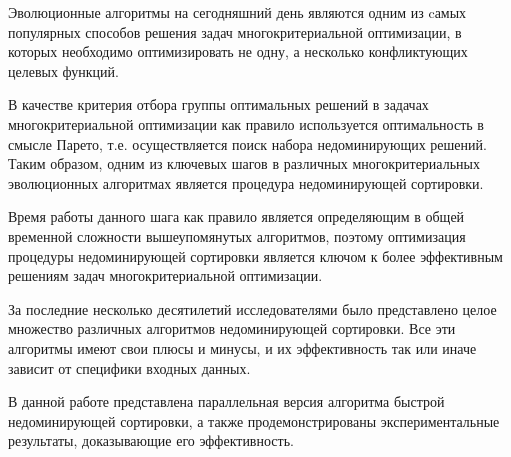 \startprefacepage
Эволюционные алгоритмы на сегодняшний день являются одним из cамых популярных способов решения задач многокритериальной оптимизации, в которых необходимо оптимизировать не одну, а несколько конфликтующих целевых функций.

В качестве критерия отбора группы оптимальных решений в задачах многокритериальной оптимизации как правило используется оптимальность в смысле Парето, т.е. осуществляется поиск набора недоминирующих решений.
Таким образом, одним из ключевых шагов в различных многокритериальных эволюционных алгоритмах является процедура недоминирующей сортировки.

Время работы данного шага как правило является определяющим в общей временной сложности вышеупомянутых алгоритмов, поэтому оптимизация процедуры недоминирующей сортировки является ключом к более эффективным решениям задач многокритериальной оптимизации.

За последние несколько десятилетий исследователями было представлено целое множество различных алгоритмов недоминирующей сортировки.
Все эти алгоритмы имеют свои плюсы и минусы, и их эффективность так или иначе зависит от специфики входных данных.

В данной работе представлена параллельная версия алгоритма быстрой недоминирующей сортировки, а также продемонстрированы экспериментальные результаты, доказывающие его эффективность.
